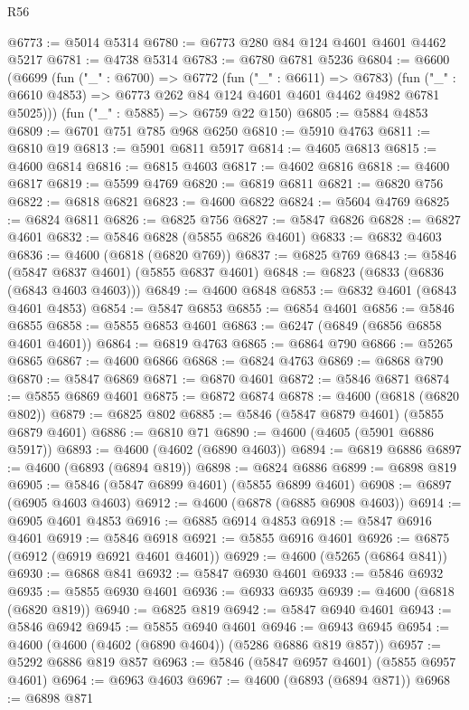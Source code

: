 \begin{lexlean}{R56}
\begin{coremodule}
@6773 := @5014 @5314
@6780 := @6773 @280 @84 @124 @4601 @4601 @4462 @5217
@6781 := @4738 @5314
@6783 := @6780 @6781 @5236
@6804 := @6600
    (@6699
      (fun ("_" : @6700) =>
      @6772
        (fun ("_" : @6611) => @6783)
        (fun ("_" : @6610 @4853) => @6773 @262 @84 @124 @4601 @4601 @4462 @4982 @6781 @5025)))
    (fun ("_" : @5885) => @6759 @22 @150)
@6805 := @5884 @4853
@6809 := @6701 @751 @785 @968 @6250
@6810 := @5910 @4763
@6811 := @6810 @19
@6813 := @5901 @6811 @5917
@6814 := @4605 @6813
@6815 := @4600 @6814
@6816 := @6815 @4603
@6817 := @4602 @6816
@6818 := @4600 @6817
@6819 := @5599 @4769
@6820 := @6819 @6811
@6821 := @6820 @756
@6822 := @6818 @6821
@6823 := @4600 @6822
@6824 := @5604 @4769
@6825 := @6824 @6811
@6826 := @6825 @756
@6827 := @5847 @6826
@6828 := @6827 @4601
@6832 := @5846 @6828 (@5855 @6826 @4601)
@6833 := @6832 @4603
@6836 := @4600 (@6818 (@6820 @769))
@6837 := @6825 @769
@6843 := @5846 (@5847 @6837 @4601) (@5855 @6837 @4601)
@6848 := @6823 (@6833 (@6836 (@6843 @4603 @4603)))
@6849 := @4600 @6848
@6853 := @6832 @4601 (@6843 @4601 @4853)
@6854 := @5847 @6853
@6855 := @6854 @4601
@6856 := @5846 @6855
@6858 := @5855 @6853 @4601
@6863 := @6247 (@6849 (@6856 @6858 @4601 @4601))
@6864 := @6819 @4763
@6865 := @6864 @790
@6866 := @5265 @6865
@6867 := @4600 @6866
@6868 := @6824 @4763
@6869 := @6868 @790
@6870 := @5847 @6869
@6871 := @6870 @4601
@6872 := @5846 @6871
@6874 := @5855 @6869 @4601
@6875 := @6872 @6874
@6878 := @4600 (@6818 (@6820 @802))
@6879 := @6825 @802
@6885 := @5846 (@5847 @6879 @4601) (@5855 @6879 @4601)
@6886 := @6810 @71
@6890 := @4600 (@4605 (@5901 @6886 @5917))
@6893 := @4600 (@4602 (@6890 @4603))
@6894 := @6819 @6886
@6897 := @4600 (@6893 (@6894 @819))
@6898 := @6824 @6886
@6899 := @6898 @819
@6905 := @5846 (@5847 @6899 @4601) (@5855 @6899 @4601)
@6908 := @6897 (@6905 @4603 @4603)
@6912 := @4600 (@6878 (@6885 @6908 @4603))
@6914 := @6905 @4601 @4853
@6916 := @6885 @6914 @4853
@6918 := @5847 @6916 @4601
@6919 := @5846 @6918
@6921 := @5855 @6916 @4601
@6926 := @6875 (@6912 (@6919 @6921 @4601 @4601))
@6929 := @4600 (@5265 (@6864 @841))
@6930 := @6868 @841
@6932 := @5847 @6930 @4601
@6933 := @5846 @6932
@6935 := @5855 @6930 @4601
@6936 := @6933 @6935
@6939 := @4600 (@6818 (@6820 @819))
@6940 := @6825 @819
@6942 := @5847 @6940 @4601
@6943 := @5846 @6942
@6945 := @5855 @6940 @4601
@6946 := @6943 @6945
@6954 := @4600 (@4600 (@4602 (@6890 @4604)) (@5286 @6886 @819 @857))
@6957 := @5292 @6886 @819 @857
@6963 := @5846 (@5847 @6957 @4601) (@5855 @6957 @4601)
@6964 := @6963 @4603
@6967 := @4600 (@6893 (@6894 @871))
@6968 := @6898 @871

\end{coremodule}
\end{lexlean}
